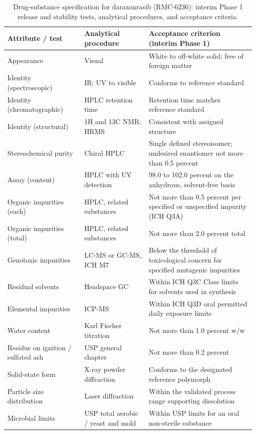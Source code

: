 \begin{table}[t]
\centering
\caption{Drug-substance specification for daraxonrasib (RMC-6236): interim
Phase 1 release and stability tests, analytical procedures, and acceptance
criteria.}
\label{tab:cmc-ds-spec}
\begin{tabularx}{\textwidth}{L{4.1cm} L{4.0cm} Y}
\toprule
\textbf{Attribute / test} & \textbf{Analytical procedure} & \textbf{Acceptance criterion (interim Phase 1)} \\
\midrule
Appearance & Visual & White to off-white solid; free of foreign matter \\
Identity (spectroscopic) & IR; UV to visible & Conforms to reference standard \\
Identity (chromatographic) & HPLC retention time & Retention time matches reference standard \\
Identity (structural) & 1H and 13C NMR; HRMS & Consistent with assigned structure \\
Stereochemical purity & Chiral HPLC & Single defined stereoisomer; undesired enantiomer not more than 0.5 percent \\
Assay (content) & HPLC with UV detection & 98.0 to 102.0 percent on the anhydrous, solvent-free basis \\
Organic impurities (each) & HPLC, related substances & Not more than 0.5 percent per specified or unspecified impurity (ICH Q3A) \\
Organic impurities (total) & HPLC, related substances & Not more than 2.0 percent total \\
Genotoxic impurities & LC-MS or GC-MS, ICH M7 & Below the threshold of toxicological concern for specified mutagenic impurities \\
Residual solvents & Headspace GC & Within ICH Q3C Class limits for solvents used in synthesis \\
Elemental impurities & ICP-MS & Within ICH Q3D oral permitted daily exposure limits \\
Water content & Karl Fischer titration & Not more than 1.0 percent w/w \\
Residue on ignition / sulfated ash & USP general chapter & Not more than 0.2 percent \\
Solid-state form & X-ray powder diffraction & Conforms to the designated reference polymorph \\
Particle size distribution & Laser diffraction & Within the validated process range supporting dissolution \\
Microbial limits & USP total aerobic / yeast and mold & Within USP limits for an oral non-sterile substance \\
\bottomrule
\end{tabularx}
\end{table}

